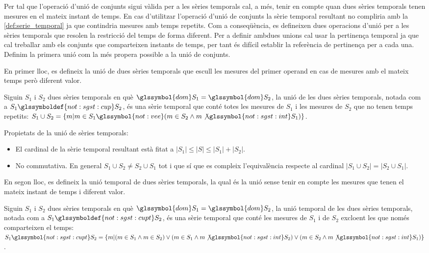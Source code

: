 Per tal que l'operació d'unió de conjunts sigui vàlida per a les
sèries temporals cal, a més, tenir en compte quan dues sèries
temporals tenen mesures en el mateix instant de temps. En cas
d'utilitzar l'operació d'unió de conjunts la sèrie temporal resultant
no compliria amb la \autoref{def:serie_temporal} ja que contindria
mesures amb temps repetits. Com a conseqüència, es defineixen dues
operacions d'unió per a les sèries temporals que resolen la restricció
del temps de forma diferent.  Per a definir ambdues unions cal usar la
pertinença temporal ja que cal treballar amb els conjunts que
comparteixen instants de temps, per tant és difícil establir la
referència de pertinença per a cada una.  Definim la primera unió com
la més propera possible a la unió de conjunts.



En primer lloc, es defineix la unió de dues sèries temporals que
escull les mesures del primer operand en cas de mesures amb el mateix
temps però diferent valor.
\begin{definition}[Unió]
  Siguin $S_1$ i $S_2$ dues sèries temporals en què $\glssymbol{dom}
  S_1 = \glssymbol{dom} S_2$, la unió de les dues sèries temporals,
  notada com a $S_1 \glssymboldef{not:sgst:cup} S_2$, és una sèrie
  temporal que conté totes les mesures de $S_1$ i les mesures de $S_2$
  que no tenen temps repetits: $S_1 \cup S_2 = \{m | m \in S_1
  \glssymbol{not:vee} (m \in S_2 \wedge m \not\glssymbol{not:sgst:int}
  S_1 )\}$.
\end{definition}

Propietats de la unió de sèries temporals:
\begin{itemize}
\item El cardinal de la sèrie temporal resultant està fitat a
  $|S_1| \leq |S| \leq |S_1| + |S_2|$. 
\item No commutativa. En general
  $S_1\cup S_2 \neq S_2\cup S_1$ tot i que sí que es compleix
  l'equivalència respecte al cardinal $|S_1 \cup S_2| = |S_2\cup S_1|$.
\end{itemize}

En segon lloc, es defineix la unió temporal de dues sèries temporals,
la qual és la unió sense tenir en compte les mesures que tenen el mateix
instant de temps i diferent valor.
\begin{definition}
  Siguin $S_1$ i $S_2$ dues sèries temporals en què $\glssymbol{dom}
  S_1 = \glssymbol{dom} S_2$, la unió temporal de les
  dues sèries temporals, notada com a $S_1
  \glssymboldef{not:sgst:cupt} S_2$, és una sèrie temporal que conté
  les mesures de $S_1$ i de $S_2$ excloent les que només comparteixen
  el temps: $S_1 \glssymbol{not:sgst:cupt} S_2 = \{ m | (m \in S_1
  \wedge m \in S_2 ) \vee ( m \in S_1 \wedge m
  \not\glssymbol{not:sgst:int} S_2) \vee (m \in S_2 \wedge m
  \not\glssymbol{not:sgst:int} S_1 )\}$.
\end{definition}


